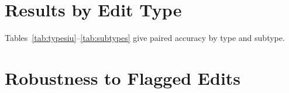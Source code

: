 \documentclass[11pt]{article}
\newcommand{\Pc}{\textsc{p}\xspace}
\newcommand{\Cc}{\textsc{c}\xspace}
\newcommand{\ctrlz}{\textsc{Ctrl-0}\xspace}
\begin{document}
\section{Results by Edit Type}
\label{app:types}

\begin{table}[t]
\centering
\small
\begin{adjustbox}{max width=\textwidth}

\end{adjustbox}
\caption{\ctrlz paired accuracy by edit type, IU X-Ray.}
\label{tab:typesiu}
\end{table}

\begin{table}[t]
\centering
\small
\begin{adjustbox}{max width=\textwidth}

\end{adjustbox}
\caption{\ctrlz paired accuracy by edit type, MIMIC-CXR.}
\label{tab:typesmimic}
\end{table}

\begin{table}[t]
\centering
\small
\begin{adjustbox}{max width=\textwidth}

\end{adjustbox}
\caption{\ctrlz paired accuracy by subtype (IU X-Ray / MIMIC-CXR). $^{\ddagger}$The unit subtype is not shape-matched (the \Pc edit changes two tokens, the \Cc edit one) and behaves like a confounded comparison for surface-driven metrics.}
\label{tab:subtypes}
\end{table}

Tables~\ref{tab:typesiu}--\ref{tab:subtypes} give paired accuracy by type and subtype.

\section{Robustness to Flagged Edits}
\label{app:robust}

\begin{table}[t]
\centering
\small
\begin{adjustbox}{max width=\textwidth}

\end{adjustbox}
\caption{\ctrlz paired accuracy (IU X-Ray / MIMIC-CXR) on all targets and after removing, in turn, the non-matched unit subtype, every target whose meaning-preserving substitution we flagged in advance as debatable, and both together with eight awkward negation rewrites.}
\label{tab:robust}
\end{table}
\end{document}
